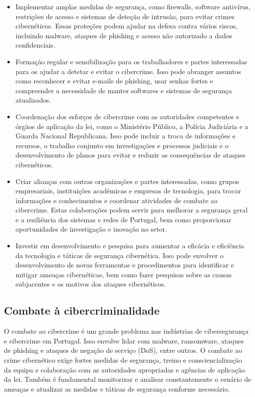 \begin{itemize}
  \item Implementar amplas medidas de segurança, como firewalls, software antivírus, restrições de acesso e sistemas de deteção de intrusão, para evitar crimes cibernéticos. Essas proteções podem ajudar na defesa contra vários riscos, incluindo malware, ataques de phishing e acesso não autorizado a dados confidenciais.
  \item Formação regular e sensibilização para os trabalhadores e partes interessadas para os ajudar a detetar e evitar o cibercrime. Isso pode abranger assuntos como reconhecer e evitar e-mails de phishing, usar senhas fortes e compreender a necessidade de manter softwares e sistemas de segurança atualizados.
  \item Coordenação dos esforços de cibercrime com as autoridades competentes e órgãos de aplicação da lei, como o Ministério Público, a Polícia Judiciária e a Guarda Nacional Republicana. Isso pode incluir a troca de informações e recursos, o trabalho conjunto em investigações e processos judiciais e o desenvolvimento de planos para evitar e reduzir as consequências de ataques cibernéticos.
  \item Criar alianças com outras organizações e partes interessadas, como grupos empresariais, instituições académicas e empresas de tecnologia, para trocar informações e conhecimentos e coordenar atividades de combate ao cibercrime. Estas colaborações podem servir para melhorar a segurança geral e a resiliência dos sistemas e redes de Portugal, bem como proporcionar oportunidades de investigação e inovação no setor.
  \item Investir em desenvolvimento e pesquisa para aumentar a eficácia e eficiência da tecnologia e táticas de segurança cibernética. Isso pode envolver o desenvolvimento de novas ferramentas e procedimentos para identificar e mitigar ameaças cibernéticas, bem como fazer pesquisas sobre as causas subjacentes e os motivos dos ataques cibernéticos.
\end{itemize}

\subsection{Combate à cibercriminalidade}

O combate ao cibercrime é um grande problema nas indústrias de cibersegurança e cibercrime em Portugal. Isso envolve lidar com malware, ransomware, ataques de phishing e ataques de negação de serviço (DoS), entre outros. O combate ao crime cibernético exige fortes medidas de segurança, treino e consciencialização da equipa e colaboração com as autoridades apropriadas e agências de aplicação da lei. Também é fundamental monitorizar e analisar constantemente o cenário de ameaças e atualizar as medidas e táticas de segurança conforme necessário.

